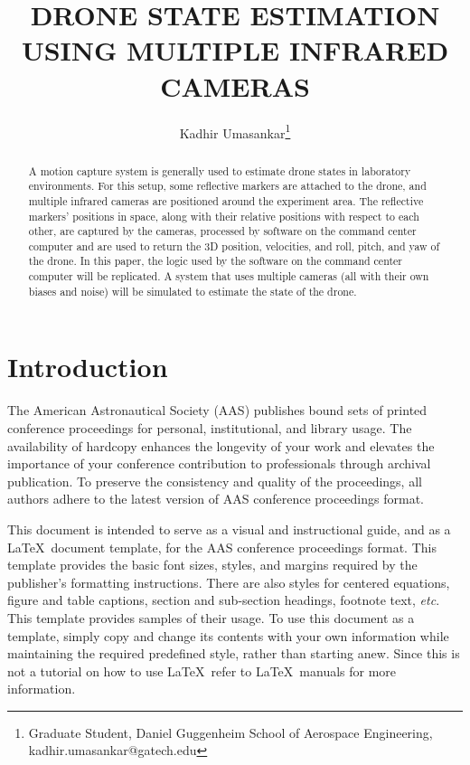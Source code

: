 \documentclass[letterpaper, preprint, paper,11pt]{AAS}	%
\begin{document}
\title{DRONE STATE ESTIMATION USING MULTIPLE INFRARED CAMERAS}

\author{Kadhir Umasankar\thanks{Graduate Student, Daniel Guggenheim School of Aerospace Engineering, kadhir.umasankar@gatech.edu}}


\maketitle{} 		


\begin{abstract}
A motion capture system is generally used to estimate drone states in laboratory environments. For this setup, some reflective markers are attached to the drone, and multiple infrared cameras are positioned around the experiment area. The reflective markers' positions in space, along with their relative positions with respect to each other, are captured by the cameras, processed by software on the command center computer and are used to return the 3D position, velocities, and roll, pitch, and yaw of the drone. In this paper, the logic used by the software on the command center computer will be replicated. A system that uses multiple cameras (all with their own biases and noise) will be simulated to estimate the state of the drone.
\end{abstract}


\section{Introduction}
The American Astronautical Society (AAS) publishes bound sets of printed conference proceedings for personal, institutional, and library usage. The availability of hardcopy enhances the longevity of your work and elevates the importance of your conference contribution to professionals through archival publication. To preserve the consistency and quality of the proceedings, all authors adhere to the latest version of AAS conference proceedings format.


This document is intended to serve as a visual and instructional guide, and as a \LaTeX\ document template, for the AAS conference proceedings format. This template provides the basic font sizes, styles, and margins required by the publisher's formatting instructions.   There are also styles for centered equations, figure and table captions, section and sub-section headings, footnote text, \emph{etc}. This template provides samples of their usage.  To use this document as a template, simply copy and change its contents with your own information while maintaining the required predefined style, rather than starting anew. Since this is not a tutorial on how to use \LaTeX\, refer to \LaTeX\ manuals for more information.
\end{document}
